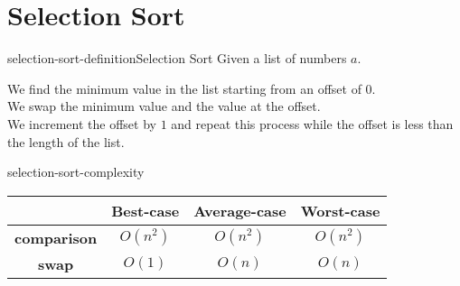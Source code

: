 \documentclass[preview]{standalone}
\begin{document}
\genpage

\section{Selection Sort}

\begin{snippetdefinition}{selection-sort-definition}{Selection Sort}
    Given a list of numbers \(a\).

    We find the minimum value in the list starting from an offset of \(0\).\\
    We swap the minimum value and the value at the offset.\\
    We increment the offset by \(1\) and repeat this process while the offset is less than the length of the list.
\end{snippetdefinition}

\begin{snippet}{selection-sort-complexity}
    \def\arraystretch{1.5}
    \begin{center}
        \begin{tabular}{ |c|c|c|c| }
            \hline
            & \textbf{Best-case} & \textbf{Average-case} &\textbf{Worst-case} \\
            \hline
            \textbf{comparison} & \(O(n^2)\) & \(O(n^2)\) & \(O(n^2)\) \\ 
            \hline
            \textbf{swap} & \(O(1)\) & \(O(n)\) & \(O(n)\) \\ 
            \hline
        \end{tabular}
    \end{center}
    \vspace{0.5cm}
\end{snippet}

\end{document}
